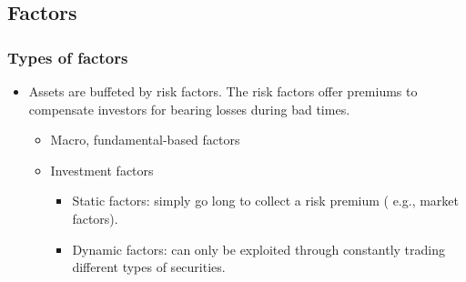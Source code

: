 \subsection{Factors}



\subsubsection{Types of factors}
\begin{itemize}
\item Assets are buffeted by risk factors. The risk factors offer premiums to compensate investors for bearing losses during bad times.
    \begin{itemize}
    \item Macro, fundamental-based factors
    \item Investment factors
        \begin{itemize}
        \item Static factors: simply go long to collect a risk premium ( e.g., market factors).
        \item Dynamic factors: can only be exploited through constantly trading different types of securities.
        \end{itemize}
    \end{itemize}
\end{itemize}



